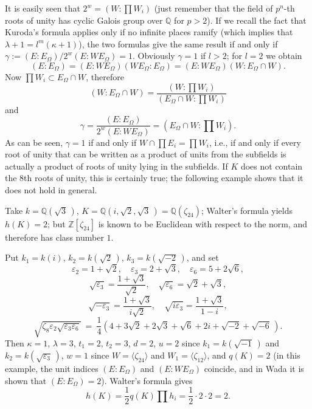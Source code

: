 \documentclass{amsart}
\newcommand{\Q}{\mathbb Q}
\newcommand{\Z}{\mathbb Z}
\newcommand{\eps}{\varepsilon}
\newcommand{\la}{\langle}
\newcommand{\ra}{\rangle}
\newcommand{\ts}{\textstyle}
\begin{document}
It is easily seen that $2^w = (W : \prod W_i)$ (just remember
that the field of $p^n$-th roots of unity has cyclic Galois
group over $\Q$ for $p > 2$). If we recall the fact that
Kuroda's formula applies only if no infinite places ramify
(which implies that $\lambda+1 = l^m(\kappa+1)$), the two
formulas give the same result if and only if
$\gamma := (E : E_\Omega)/2^w(E:WE_\Omega) = 1$. Obviously
$\gamma = 1$ if $l > 2$; for $l = 2$ we obtain
$$ (E:E_\Omega) = (E : WE_\Omega)(W E_\Omega : E_\Omega)
   = (E : WE_\Omega)(W : E_\Omega \cap W). $$
Now $\prod W_i \subset E_\Omega \cap W$, therefore
$$ (W : E_\Omega \cap W) =
     \frac{(W : \prod W_i)}{(E_\Omega  \cap W: \prod W_i)}$$
and
$$ \gamma = \frac{(E : E_\Omega)}{2^w (E : WE_\Omega)}
      = (E_\Omega \cap W : \prod W_i). $$
As can be seen, $\gamma = 1$ if and only if
$W \cap \prod E_i = \prod W_i$, i.e., if and only if every
root of unity that can be written as a product of units from
the subfields is actually a product of roots of unity lying
in the subfields. If $K$ does not contain the $8$th roots of
unity, this is certainly true; the following example shows that
it does not hold in general.

Take $k = \Q(\sqrt{3}\,)$, $K = \Q(i,\sqrt{2}, \sqrt{3}\,) =
\Q(\zeta_{24})$; Walter's formula yields $h(K) = 2$; but
$\Z[\zeta_{24}]$ is known to be Euclidean with respect to the norm,
and therefore has class number $1$.

Put $k_1 = k(i)$, $k_2 = k(\sqrt{2}\,)$, $k_3 = k(\sqrt{-2}\,)$,
and set
$$ \eps_2 = 1 + \sqrt{2}, \quad \eps_3 = 2 + \sqrt{3}, \quad
   \eps_6 = 5 + 2\sqrt{6}, $$
$$ \sqrt{\eps_3} = \frac{1+\sqrt{3}}{\sqrt{2}}, \quad
   \sqrt{\eps_6} = \sqrt{2} + \sqrt{3}, $$
$$ \sqrt{-\eps_3} = \frac{1+\sqrt{3}}{i\sqrt{2}}, \quad
   \sqrt{i\eps_3} = \frac{1+\sqrt{3}}{1-i}, $$
$$ \sqrt{\zeta_8\eps_2\sqrt{\eps_3\eps_6}}
   \ = \ \frac14(4 + 3\sqrt{2} + 2\sqrt{3}
         + \sqrt{6} + 2i + \sqrt{-2} + \sqrt{-6}\,).$$
Then $\kappa = 1$, $\lambda = 3$, $t_1 = 2$, $t_2 = 3$, $d = 2$,
$u = 2$ since $k_1 = k(\sqrt{-1}\,)$ and $k_2 = k(\sqrt{\eps_3}\,)$,
$w = 1$ since $W = \la \zeta_{24} \ra$ and $W_1 = \la \zeta_{12} \ra$,
and $q(K) = 2$ (in this example, the unit indices $(E : E_\Omega)$
and $(E:WE_\Omega)$ coincide, and in Wada \cite{Wad} it is shown
that $(E : E_\Omega) = 2$). Walter's formula gives
$$ \ts h(K) = \frac12 q(K) \prod h_i = \frac12 \cdot 2 \cdot 2 = 2.$$
\end{document}
